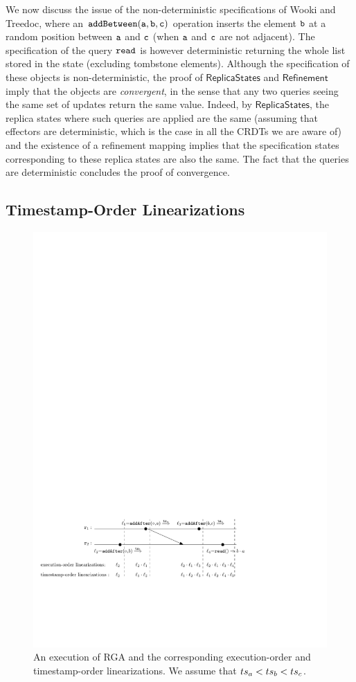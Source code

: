 We now discuss the issue of the non-deterministic specifications of Wooki and Treedoc, where an ${\tt addBetween(a,b,c)}$ operation inserts the element ${\tt b}$ at a random position between ${\tt a}$ and ${\tt c}$ (when ${\tt a}$ and ${\tt c}$ are not adjacent). The specification of the query ${\tt read}$ is however deterministic returning the whole list stored in the state (excluding tombstone elements). Although the specification of these objects is non-deterministic, the proof of $\mathsf{ReplicaStates}$ and $\mathsf{Refinement}$ imply that the objects are \emph{convergent}, in the sense that any two queries seeing the same set of updates return the same value. Indeed, by $\mathsf{ReplicaStates}$, the replica states where such queries are applied are the same (assuming that effectors are deterministic, which is the case in all the CRDTs we are aware of) and the existence of a refinement mapping implies that the specification states corresponding to these replica states are also the same. The fact that the queries are deterministic concludes the proof of convergence.

\subsection{Timestamp-Order Linearizations}
\label{subsec:time-stamp order as linearizabtion}

\begin{figure}[t]
  \centering
  \includegraphics[width=0.7 \textwidth]{figures/RGAHisandLin.pdf}
  \caption{An execution of RGA and the corresponding execution-order and timestamp-order linearizations. We assume that $ts_a<ts_b<ts_c$.}
  \label{fig:a history of RGA and its RA-linearization}
\end{figure}

